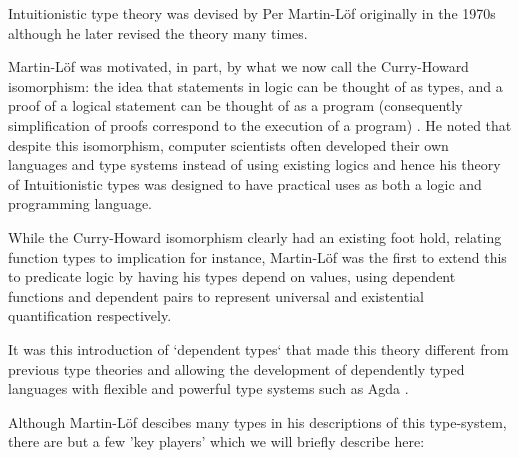 \documentclass{ProgressReport}[2020/09/15]
\begin{document}
          Intuitionistic type theory was devised by Per Martin-Löf
          \cite{martinlof1980} originally in the 1970s although he
          later revised the theory many times.

          Martin-Löf was motivated, in part, by what we now call the
          Curry-Howard isomorphism: the idea that statements in logic can be
          thought of as types, and a proof of a logical statement can
          be thought of as a program (consequently simplification of
          proofs correspond to the execution of a program)
          \cite{wadler2015}. He noted that despite this isomorphism,
          computer scientists often developed their own
          languages and type systems instead of using existing
          logics and hence his theory of Intuitionistic types was
          designed to have practical uses as both a logic and
          programming language.

          While the Curry-Howard isomorphism clearly had an existing
          foot hold, relating function types to implication for
          instance, Martin-Löf was the first to extend this to
          predicate logic by having his types depend on values,
          using dependent functions and dependent pairs to represent
          universal and existential quantification respectively.

          It was this introduction of `dependent types` that made this
          theory different from previous type theories and allowing
          the development of dependently typed languages with flexible
          and powerful type systems such as Agda \cite{norell}.

          Although Martin-Löf descibes many types in his descriptions
          of this type-system, there are but a few 'key players' which
          we will briefly describe here:
\end{document}
